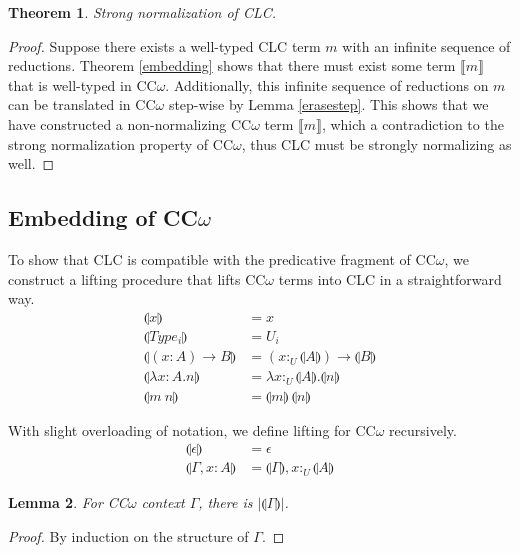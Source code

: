 \documentclass{article}
\newtheorem{theorem}{Theorem}[section]
\newtheorem{lemma}[theorem]{Lemma}
\theoremstyle{definition}
\newcommand{\pure}[1]{|#1|}
\newcommand{\utype}{:_{\scriptscriptstyle U}}
\newcommand{\erase}[1]{\llbracket #1 \rrbracket}
\newcommand{\lift}[1]{\llparenthesis #1 \rrparenthesis}
\begin{document}
\begin{theorem}
  Strong normalization of CLC.
\end{theorem}
\begin{proof}
  Suppose there exists a well-typed CLC term $m$ with an infinite sequence of reductions. Theorem \ref{embedding} shows that there must exist some term $\erase{m}$ that is well-typed in CC$\omega$. Additionally, this infinite sequence of reductions on $m$ can be translated in CC$\omega$ step-wise by Lemma \ref{erasestep}. This shows that we have constructed a non-normalizing CC$\omega$ term $\erase{m}$, which a contradiction to the strong normalization property of CC$\omega$, thus CLC must be strongly normalizing as well.
\end{proof}

\subsection{Embedding of CC$\omega$}
To show that CLC is compatible with the predicative fragment of CC$\omega$, we construct a lifting procedure that lifts CC$\omega$ terms into CLC in a straightforward way.
\begin{align*}
  \lift{x}                     & = x                                        \\
  \lift{Type_i}                & = U_i                                      \\
  \lift{(x : A) \rightarrow B} & = (x \utype \lift{A}) \rightarrow \lift{B} \\
  \lift{\lambda x : A.n}       & = \lambda x\utype\lift{A}.\lift{n}         \\
  \lift{m\ n}                  & = \lift{m}\ \lift{n}
\end{align*}

With slight overloading of notation, we define lifting for CC$\omega$ recursively.
\begin{align*}
  \lift{\epsilon}      & = \epsilon                         \\
  \lift{\Gamma, x : A} & = \lift{\Gamma}, x \utype \lift{A}
\end{align*}

\begin{lemma}
  For CC$\omega$ context $\Gamma$, there is $\pure{\lift{\Gamma}}$.
\end{lemma}
\begin{proof}
  By induction on the structure of $\Gamma$.
\end{proof}
\end{document}

